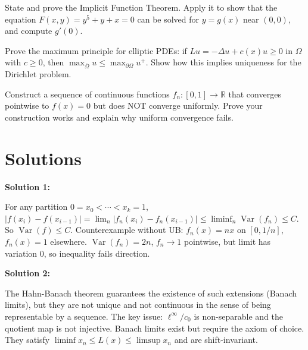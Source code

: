 \documentclass[12pt,a4paper]{exam}
\begin{document}
\begin{questions}
\vspace{0.3cm}

\question[4]
State and prove the Implicit Function Theorem. Apply it to show that the equation $F(x,y) = y^5 + y + x = 0$ can be solved for $y = g(x)$ near $(0,0)$, and compute $g'(0)$.

\vspace{0.3cm}

\question[8]
Prove the maximum principle for elliptic PDEs: if $Lu = -\Delta u + c(x) u \geq 0$ in $\Omega$ with $c \geq 0$, then $\max_{\overline{\Omega}} u \leq \max_{\partial\Omega} u^+$. Show how this implies uniqueness for the Dirichlet problem.

\vspace{0.3cm}

\question[6]
Construct a sequence of continuous functions $f_n: [0,1] \to \mathbb{R}$ that converges pointwise to $f(x) = 0$ but does NOT converge uniformly. Prove your construction works and explain why uniform convergence fails.

\vspace{0.3cm}

\end{questions}

\newpage
\section*{Solutions}

\textbf{Solution 1:}

For any partition $0 = x_0 < \cdots < x_k = 1$, $|f(x_i) - f(x_{i-1})| = \lim_n |f_n(x_i) - f_n(x_{i-1})| \leq \liminf_n \operatorname{Var}(f_n) \leq C$. So $\operatorname{Var}(f) \leq C$. Counterexample without UB: $f_n(x) = n x$ on $[0,1/n]$, $f_n(x)=1$ elsewhere. $\operatorname{Var}(f_n) = 2n$, $f_n \to 1$ pointwise, but limit has variation 0, so inequality fails direction.

\vspace{0.5cm}

\textbf{Solution 2:}

The Hahn-Banach theorem guarantees the existence of such extensions (Banach limits), but they are not unique and not continuous in the sense of being representable by a sequence. The key issue: $\ell^\infty / c_0$ is non-separable and the quotient map is not injective. Banach limits exist but require the axiom of choice. They satisfy $\liminf x_n \leq L(x) \leq \limsup x_n$ and are shift-invariant.

\vspace{0.5cm}
\end{document}
